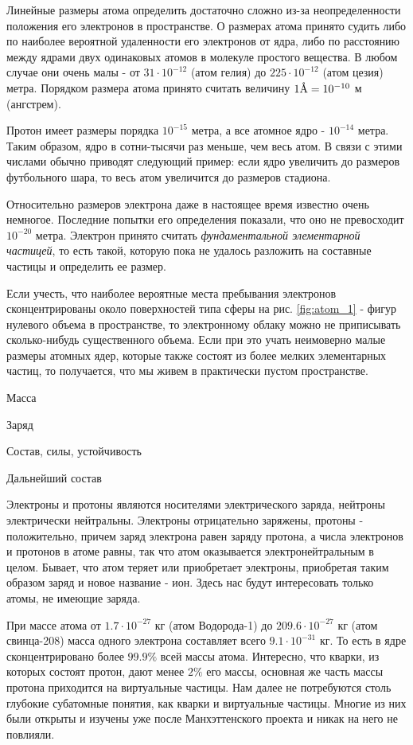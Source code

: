 Линейные размеры атома определить достаточно сложно из-за неопределенности положения его электронов в пространстве.
О размерах атома принято судить либо по наиболее вероятной удаленности его электронов от ядра, либо по расстоянию между ядрами двух одинаковых атомов в молекуле простого вещества.
В любом случае они очень малы - от $31\cdot 10^{-12}$ (атом гелия) до $225\cdot 10^{-12}$ (атом цезия) метра.
Порядком размера атома принято считать величину $1\mbox{\normalfont\AA} = 10^{-10}$ м (ангстрем).

Протон имеет размеры порядка $10^{-15}$ метра, а все атомное ядро - $10^{-14}$ метра.
Таким образом, ядро в сотни-тысячи раз меньше, чем весь атом.
В связи с этими числами обычно приводят следующий пример: если ядро увеличить до размеров футбольного шара, то весь атом увеличится до размеров стадиона.

Относительно размеров электрона даже в настоящее время известно очень немногое.
Последние попытки его определения показали, что оно не превосходит $10^{-20}$ метра.
Электрон принято считать \textit{фундаментальной элементарной частицей}, то есть такой, которую пока не удалось разложить на составные частицы и определить ее размер.

Если учесть, что наиболее вероятные места пребывания электронов сконцентрированы около поверхностей типа сферы на рис. \ref{fig:atom_1} - фигур нулевого объема в пространстве, то электронному облаку можно не приписывать сколько-нибудь существенного объема.
Если при это учать неимоверно малые размеры атомных ядер, которые также состоят из более мелких элементарных частиц, то получается, что мы живем в практически пустом пространстве.


Масса

Заряд

Состав, силы, устойчивость

Дальнейший состав






Электроны и протоны являются носителями электрического заряда, нейтроны электрически нейтральны. 
Электроны отрицательно заряжены, протоны - положительно, причем заряд электрона равен заряду протона, а числа электронов и протонов в атоме равны, так что атом оказывается электронейтральным в целом.
Бывает, что атом теряет или приобретает электроны, приобретая таким образом заряд и новое название - ион.
Здесь нас будут интересовать только атомы, не имеющие заряда.

При массе атома от $1.7\cdot 10^{-27}$ кг (атом Водорода-1) до $209.6\cdot 10^{-27}$ кг (атом свинца-208) масса одного электрона составляет всего $9.1\cdot 10^{-31}$ кг.
То есть в ядре сконцентрировано более $99.9\%$ всей массы атома.
Интересно, что кварки, из которых состоят протон, дают менее $2\%$ его массы, основная же часть массы протона приходится на виртуальные частицы.
Нам далее не потребуются столь глубокие субатомные понятия, как кварки и виртуальные частицы. 
Многие из них были открыты и изучены уже после Манхэттенского проекта и никак на него не повлияли. 


